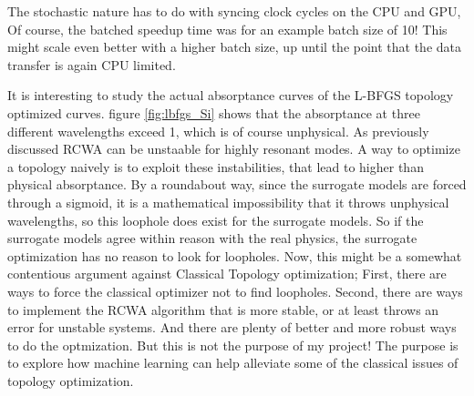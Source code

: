 The stochastic nature has to do with syncing clock cycles on the CPU and GPU, Of course, the batched speedup time was for an example batch size of 10! This might scale even better with a higher batch size, up until the point that the data transfer is again CPU limited.
\begin{table}[h!]
    \centering
    \caption{Computational timing comparison between TORCWA and surrogate models for evaluating 10 sample structures. Surrogate models show massive acceleration, especially when batched. For reference, Silicon is in general the slowest material for RCWA to solve, which this was. The time for the surrogate solver is constant with material.
    As always with tables such as these, it is important to remember that the surrogate models only work if they have data to train on, and the time it took to generate that data is not included here.}
    \label{tab:timing_comparison}
\end{table}
It is interesting to study the actual absorptance curves of the L-BFGS topology optimized curves. figure \ref{fig:lbfgs_Si} shows that the absorptance at three different wavelengths exceed 1, which is of course unphysical. As previously discussed RCWA can be unstaable for highly resonant modes. A way to optimize a topology naively is to exploit these instabilities, that lead to higher than physical absorptance.
By a roundabout way, since the surrogate models are forced through a sigmoid, it is a mathematical impossibility that it throws unphysical wavelengths, so this loophole does exist for the surrogate models. So if the surrogate models agree within reason with the real physics, the surrogate optimization has no reason to look for loopholes.
Now, this might be a somewhat contentious argument against Classical Topology optimization; First, there are ways to force the classical optimizer not to find loopholes. Second, there are ways to implement the RCWA algorithm that is more stable, or at least throws an error for unstable systems. And there are plenty of better and more robust ways to do the optmization.
But this is not the purpose of my project! The purpose is to explore how machine learning can help alleviate some of the classical issues of topology optimization.

